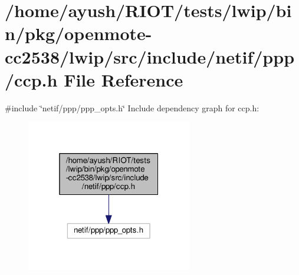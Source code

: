\hypertarget{openmote-cc2538_2lwip_2src_2include_2netif_2ppp_2ccp_8h}{}\section{/home/ayush/\+R\+I\+O\+T/tests/lwip/bin/pkg/openmote-\/cc2538/lwip/src/include/netif/ppp/ccp.h File Reference}
\label{openmote-cc2538_2lwip_2src_2include_2netif_2ppp_2ccp_8h}
{\ttfamily \#include \char`\"{}netif/ppp/ppp\+\_\+opts.\+h\char`\"{}}\newline
Include dependency graph for ccp.\+h\+:
\nopagebreak
\begin{figure}[H]
\begin{center}
\leavevmode
\includegraphics[width=205pt]{openmote-cc2538_2lwip_2src_2include_2netif_2ppp_2ccp_8h__incl}
\end{center}
\end{figure}
